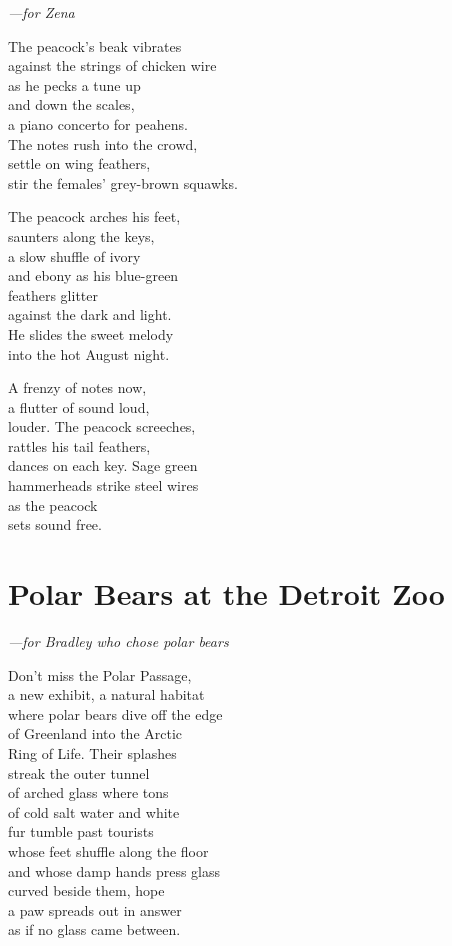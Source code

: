 \documentclass[twoside,10pt]{book}
\begin{document}
\emph{---for Zena}

The peacock's beak vibrates\\
against the strings of chicken wire\\
as he pecks a tune up\\
and down the scales,\\
a piano concerto for peahens.\\
The notes rush into the crowd,\\
settle on wing feathers,\\
stir the females' grey-brown squawks.

The peacock arches his feet,\\
saunters along the keys,\\
a slow shuffle of ivory\\
and ebony as his blue-green\\
feathers glitter\\
against the dark and light.\\
He slides the sweet melody\\
into the hot August night.

A frenzy of notes now,\\
a flutter of sound loud,\\
louder. The peacock screeches,\\
rattles his tail feathers,\\
dances on each key. Sage green\\
hammerheads strike steel wires\\
as the peacock\\
sets sound free.


\clearpage
\section{Polar Bears at the Detroit Zoo}

\emph{---for Bradley who chose polar bears}

Don't miss the Polar Passage,\\
a new exhibit, a natural habitat\\
where polar bears dive off the edge\\
of Greenland into the Arctic\\
Ring of Life. Their splashes\\
streak the outer tunnel\\
of arched glass where tons\\
of cold salt water and white\\
fur tumble past tourists\\
whose feet shuffle along the floor\\
and whose damp hands press glass\\
curved beside them, hope\\
a paw spreads out in answer\\
as if no glass came between.
\end{document}
